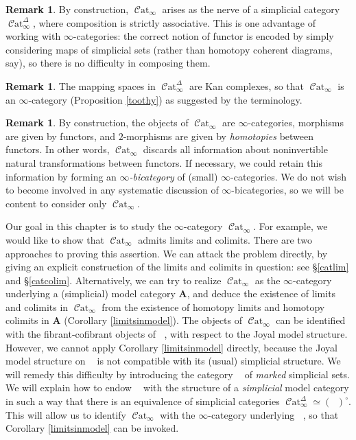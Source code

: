 \documentclass[12pt, final]{report}
\newcommand{\bfA}{{\mathbf A}}
\newcommand{\degree}{\circ}
\DeclareMathOperator{\sSet}{\mathcal{S}et_{\Delta}}
\DeclareMathOperator{\mSet}{\mathcal{S}et_{\Delta}^{+}}
\DeclareMathOperator{\Cat}{\mathcal{C}at}
\theoremstyle{definition}
\newtheorem{remark}[theorem]{Remark}
\begin{document}
\begin{remark}
By construction, $\Cat_{\infty}$ arises as the nerve of a simplicial category
$\Cat_{\infty}^{\Delta}$, where composition is strictly associative. This is one advantage
of working with $\infty$-categories: the correct notion of functor is encoded by simply considering maps of simplicial sets (rather than homotopy coherent diagrams, say), so there is no difficulty in composing them.
\end{remark}

\begin{remark}
The mapping spaces in $\Cat^{\Delta}_{\infty}$ are Kan complexes, so that
$\Cat_{\infty}$ is an $\infty$-category (Proposition \ref{toothy}) as suggested by the terminology.
\end{remark}

\begin{remark}
By construction, the objects of $\Cat_{\infty}$ are $\infty$-categories, morphisms are given by functors, and $2$-morphisms are given by {\em homotopies} between functors. In other words, $\Cat_{\infty}$ discards all information about noninvertible natural transformations between functors. If necessary, we could retain this information by forming an {\it $\infty$-bicategory} of (small) $\infty$-categories. We do not wish to become involved in any systematic discussion of $\infty$-bicategories, so we will be content to consider only $\Cat_{\infty}$.
\end{remark}

Our goal in this chapter is to study the $\infty$-category $\Cat_{\infty}$. For example, we would like to show that $\Cat_{\infty}$ admits limits and colimits. There are two approaches to proving this assertion. We can attack the problem directly, by giving an explicit construction of the limits and colimits in question: see \S \ref{catlim} and \S \ref{catcolim}. Alternatively, we can try to
realize $\Cat_{\infty}$ as the $\infty$-category underlying a (simplicial) model category $\bfA$, and deduce the existence of limits and colimits in $\Cat_{\infty}$ from the existence of homotopy limits and homotopy colimits in $\bfA$ (Corollary \ref{limitsinmodel}). The objects of $\Cat_{\infty}$ can be identified with the fibrant-cofibrant objects of $\sSet$, with respect to the Joyal model structure. However, we cannot apply Corollary \ref{limitsinmodel} directly, because the Joyal model structure on $\sSet$ is not compatible with its (usual) simplicial structure. We will remedy this difficulty by introducing the category $\mSet$ of {\em marked} simplicial sets. We will explain how to endow $\mSet$ with the structure of a {\em simplicial} model category in such a way that there is an equivalence of simplicial categories $\Cat^{\Delta}_{\infty} \simeq (\mSet)^{\degree}$. This will allow us to identify $\Cat_{\infty}$ with the $\infty$-category underlying $\mSet$, so that Corollary \ref{limitsinmodel} can be invoked.
\end{document}
